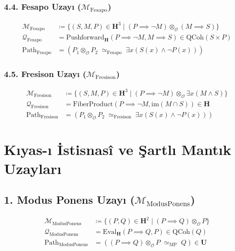 \documentclass[11pt, a4paper]{article}
\begin{document}
\subsubsection{4.4. Fesapo Uzayı ($\mathcal{M}_{\text{Fesapo}}$)}
\begin{align}
\mathcal{M}_{\text{Fesapo}} &\coloneqq \{ (S, M, P) \in \mathbf{H}^3 \mid (P \implies \neg M) \otimes_{\mathcal{O}} (M \implies S) \} \\
\mathcal{Q}_{\text{Fesapo}} &= \text{Pushforward}_{\mathbf{H}}(P \implies \neg M, M \implies S) \in \text{QCoh}(S \times P) \\
\text{Path}_{\text{Fesapo}} &= (P_1 \otimes_{\mathcal{O}} P_2 \;\simeq_{\text{Fesapo}}\; \exists x (S(x) \land \neg P(x)))
\end{align}

\subsubsection{4.5. Fresison Uzayı ($\mathcal{M}_{\text{Fresison}}$)}
\begin{align}
\mathcal{M}_{\text{Fresison}} &\coloneqq \{ (S, M, P) \in \mathbf{H}^3 \mid (P \implies \neg M) \otimes_{\mathcal{O}} \exists x (M \land S) \} \\
\mathcal{Q}_{\text{Fresison}} &= \text{FiberProduct}(P \implies \neg M, \text{im}(M \cap S)) \in \mathbf{H} \\
\text{Path}_{\text{Fresison}} &= (P_1 \otimes_{\mathcal{O}} P_2 \;\simeq_{\text{Fresison}}\; \exists x (S(x) \land \neg P(x)))
\end{align}

\section{Kıyas-ı İstisnasî ve Şartlı Mantık Uzayları}

\subsection{1. Modus Ponens Uzayı ($\mathcal{M}_{\text{ModusPonens}}$)}
\begin{align}
\mathcal{M}_{\text{ModusPonens}} &\coloneqq \{ (P, Q) \in \mathbf{H}^2 \mid (P \implies Q) \otimes_{\mathcal{O}} P \} \\
\mathcal{Q}_{\text{ModusPonens}} &= \text{Eval}_{\mathbf{H}}(P \implies Q, P) \in \text{QCoh}(Q) \\
\text{Path}_{\text{ModusPonens}} &= ((P \implies Q) \otimes_{\mathcal{O}} P \;\simeq_{\text{MP}}\; Q) \in \mathbf{U}
\end{align}
\end{document}
